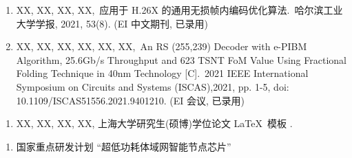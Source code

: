 \begin{publications}
    \begin{enumerate}
        \item XX, XX, XX, XX,\,
              应用于 H.26X 的通用无损帧内编码优化算法.\,
              哈尔滨工业大学学报, 2021, 53(8). (EI 中文期刊, 已录用)

        \item XX, XX, XX, XX, XX, XX,\,
              An RS (255,239) Decoder with e-PIBM Algorithm, 25.6Gb/s Throughput and 623 TSNT FoM Value Using Fractional Folding Technique in 40nm Technology [C].\,
              2021 IEEE International Symposium on Circuits and Systems (ISCAS),2021, pp. 1-5, doi: 10.1109/ISCAS51556.2021.9401210. (EI 会议, 已录用)
    \end{enumerate}

    \begin{enumerate}
        \item XX, XX, XX, XX, 上海大学研究生(硕博)学位论文 \LaTeX\ 模板 \shuthesis.
    \end{enumerate}

    \begin{enumerate}
        \item 国家重点研发计划 “超低功耗体域网智能节点芯片”
    \end{enumerate}
\end{publications}